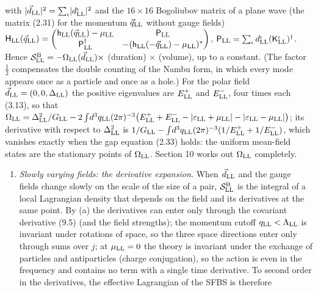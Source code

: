 \documentclass[
  10pt,
]{article}
\providecommand{\tightlist}{%
  \setlength{\itemsep}{0pt}\setlength{\parskip}{0pt}}
\begin{document}
with
\(\lvert\vec d_{\rm LL}\rvert^2=\sum_\iota\lvert d^\iota_{\rm LL}\rvert^2\)
and the \(16\times16\) Bogoliubov matrix of a plane wave (the matrix
(2.31) for the momentum \(\vec q_{\rm LL}\) without gauge fields)
\(\mathsf H_{\rm LL}(\vec q_{\rm LL})=\begin{pmatrix}\mathsf h_{\rm LL}(\vec q_{\rm LL})-\mu_{\rm LL}&\mathsf P_{\rm LL}\\\mathsf P^\dagger_{\rm LL}&-(\mathsf h_{\rm LL}(-\vec q_{\rm LL})-\mu_{\rm LL})^*\end{pmatrix}\),
\(\mathsf P_{\rm LL}=\sum_\iota d^\iota_{\rm LL}(\mathsf K^\iota_{\rm LL})^\dagger\).
Hence
\(\mathcal S^{\rm B}_{\rm LL}=-\Omega_{\rm LL}(\vec d_{\rm LL})\times\)
(duration) \(\times\) (volume), up to a constant. (The factor
\(\tfrac12\) compensates the double counting of the Nambu form, in which
every mode appears once as a particle and once as a hole.) For the polar
field \(\vec d_{\rm LL}=(0,0,\Delta_{\rm LL})\) the positive eigenvalues
are \(E^+_{\rm LL}\) and \(E^-_{\rm LL}\), four times each (3.13), so
that
\(\Omega_{\rm LL}=\Delta_{\rm LL}^2/G_{\rm LL}-2\int\!d^3q_{\rm LL}(2\pi)^{-3}\big(E^+_{\rm LL}+E^-_{\rm LL}-\lvert\varepsilon_{\rm LL}+\mu_{\rm LL}\rvert-\lvert\varepsilon_{\rm LL}-\mu_{\rm LL}\rvert\big)\);
its derivative with respect to \(\Delta_{\rm LL}^2\) is
\(1/G_{\rm LL}-\int\!d^3q_{\rm LL}(2\pi)^{-3}(1/E^+_{\rm LL}+1/E^-_{\rm LL})\),
which vanishes exactly when the gap equation (2.33) holds: the uniform
mean-field states are the stationary points of \(\Omega_{\rm LL}\).
Section 10 works out \(\Omega_{\rm LL}\) completely.

\begin{enumerate}
\def\labelenumi{(\alph{enumi})}
\setcounter{enumi}{2}
\tightlist
\item
  \emph{Slowly varying fields: the derivative expansion.} When
  \(\vec d_{\rm LL}\) and the gauge fields change slowly on the scale of
  the size of a pair, \(\mathcal S^{\rm B}_{\rm LL}\) is the integral of
  a local Lagrangian density that depends on the field and its
  derivatives at the same point. By (a) the derivatives can enter only
  through the covariant derivative (9.5) (and the field strengths); the
  momentum cutoff \(q_{\rm LL}<\Lambda_{\rm LL}\) is invariant under
  rotations of space, so the three space directions enter only through
  sums over \(j\); at \(\mu_{\rm LL}=0\) the theory is invariant under
  the exchange of particles and antiparticles (charge conjugation), so
  the action is even in the frequency and contains no term with a single
  time derivative. To second order in the derivatives, the effective
  Lagrangian of the SFBS is therefore
\end{enumerate}
\end{document}
